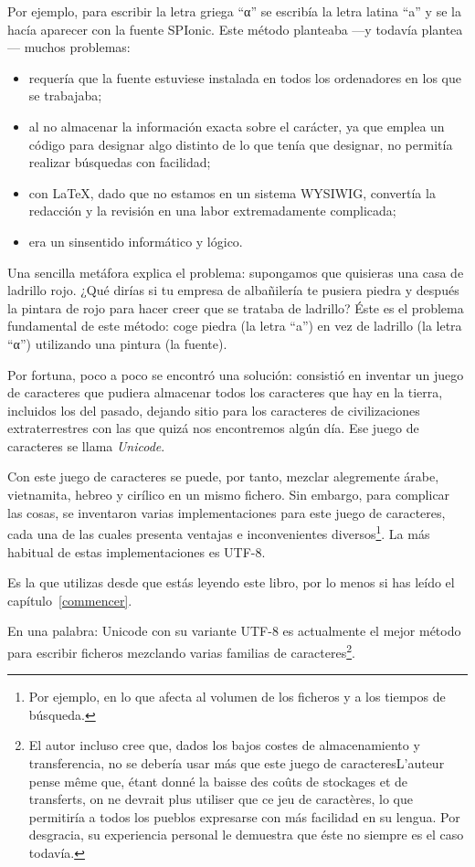 Por ejemplo, para escribir la letra griega \enquote{α} se escribía la letra latina \enquote{a} y se la hacía aparecer con la fuente SPIonic. Este método planteaba ---y todavía plantea--- muchos problemas:
\begin{itemize}
\item requería que la fuente estuviese instalada en todos los ordenadores en los que se trabajaba;
\item al no almacenar la información exacta sobre el carácter, ya que emplea un código para designar algo distinto de lo que tenía que designar, no permitía realizar búsquedas con facilidad;
\item con \LaTeX, dado que no estamos en un sistema WYSIWIG, convertía la redacción y la revisión en una labor extremadamente complicada;
\item era un sinsentido informático y lógico. 
\end{itemize}

Una sencilla metáfora explica el problema: supongamos que quisieras una casa de ladrillo rojo. ¿Qué dirías si tu empresa de albañilería te pusiera piedra y después la pintara de rojo para hacer creer que se trataba de ladrillo? Éste es el problema fundamental de este método: coge piedra (la letra \enquote{a}) en vez de ladrillo (la letra \enquote{α}) utilizando una pintura (la fuente).

Por fortuna, poco a poco se encontró una solución: consistió en inventar un juego de caracteres que pudiera almacenar todos los caracteres que hay en la tierra, incluidos los del pasado, dejando sitio para los caracteres de civilizaciones extraterrestres con las que quizá nos encontremos algún día. Ese juego de caracteres se llama \emph{Unicode}.

Con este juego de caracteres se puede, por tanto, mezclar alegremente árabe, vietnamita, hebreo y cirílico en un mismo fichero. Sin embargo, para complicar las cosas, se inventaron varias implementaciones para este juego de caracteres, cada una de las cuales presenta ventajas e inconvenientes diversos\footnote{Por ejemplo, en lo que afecta al volumen de los ficheros y a los tiempos de búsqueda.}. La más habitual de estas implementaciones es UTF-8.

Es la que utilizas desde que estás leyendo este libro, por lo menos si has leído el capítulo~\ref{commencer}.

En una palabra: Unicode con su variante UTF-8 es actualmente el mejor método para escribir ficheros mezclando varias familias de caracteres\footnote{El autor incluso cree que, dados los bajos costes de almacenamiento y transferencia, no se debería usar más que este juego de caracteresL'auteur pense même que, étant donné la baisse des coûts de stockages et de transferts, on ne devrait plus utiliser que ce jeu de caractères, lo que permitiría a todos los pueblos expresarse con más facilidad en su lengua. Por desgracia, su experiencia personal le demuestra que éste no siempre es el caso todavía.}.

